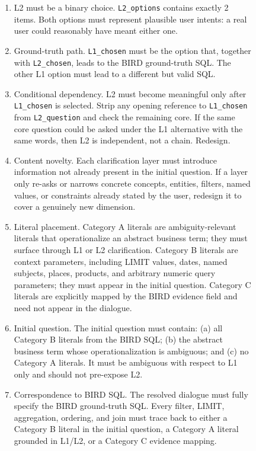 \begin{figure}[t]
\begin{tcolorbox}[
  width=1.03\textwidth,
  enhanced,
  colback=white,
  colframe=black,
  boxrule=0.5pt,
  arc=0.8mm,
  left=1.6mm,
  right=1.6mm,
  top=1.3mm,
  bottom=1.3mm
]
\begin{enumerate}[leftmargin=1.8em,itemsep=0.22em,topsep=0.15em,label=C\arabic*.]
    \item L2 must be a binary choice.
    \texttt{L2\_options} contains exactly 2 items. Both options must represent
    plausible user intents: a real user could reasonably have meant either one.

    \item Ground-truth path.
    \texttt{L1\_chosen} must be the option that, together with
    \texttt{L2\_chosen}, leads to the BIRD ground-truth SQL. The other L1 option
    must lead to a different but valid SQL.

    \item Conditional dependency.
    L2 must become meaningful only after \texttt{L1\_chosen} is selected. Strip
    any opening reference to \texttt{L1\_chosen} from \texttt{L2\_question}
    and check the remaining core. If the same core question could be asked under
    the L1 alternative with the same words, then L2 is independent, not a chain.
    Redesign.

    \item Content novelty.
    Each clarification layer must introduce information not already present in
    the initial question. If a layer only re-asks or narrows concrete concepts,
    entities, filters, named values, or constraints already stated by the user,
    redesign it to cover a genuinely new dimension.

    \item Literal placement.
    Category A literals are ambiguity-relevant literals that operationalize an
    abstract business term; they must surface through L1 or L2 clarification.
    Category B literals are context parameters, including LIMIT values, dates,
    named subjects, places, products, and arbitrary numeric query parameters;
    they must appear in the initial question. Category C literals are explicitly
    mapped by the BIRD evidence field and need not appear in the dialogue.

    \item Initial question.
    The initial question must contain: (a) all Category B literals from the BIRD
    SQL; (b) the abstract business term whose operationalization is ambiguous;
    and (c) no Category A literals. It must be ambiguous with respect to L1 only
    and should not pre-expose L2.

    \item Correspondence to BIRD SQL.
    The resolved dialogue must fully specify the BIRD ground-truth SQL. Every
    filter, LIMIT, aggregation, ordering, and join must trace back to either a
    Category B literal in the initial question, a Category A literal grounded in
    L1/L2, or a Category C evidence mapping.


\end{enumerate}
\end{tcolorbox}
\end{figure}
